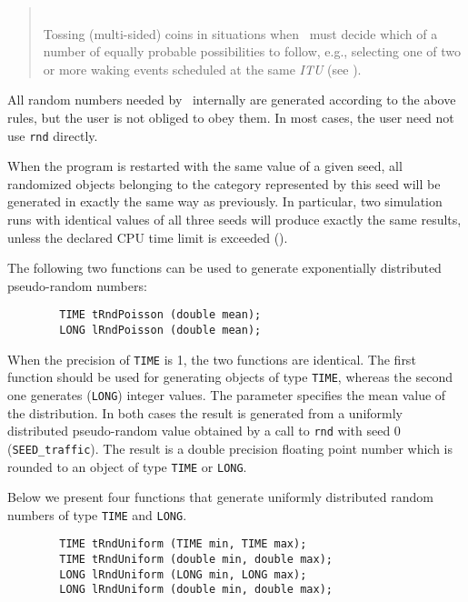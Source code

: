\begin{quote}
\noindent{}\\ \hspace{0in}
Tossing (multi-sided) coins in situations when \smurph\ must
decide which of a number of equally probable possibilities to
follow, e.g., selecting one of two or more waking events scheduled at the
same {\em ITU\/} (see ).
\end{quote}\medskip

All random numbers needed by \smurph\ internally are generated according
to the above rules, but the user is not obliged to obey them.
In most cases, the user need not use {\tt rnd} directly.

When the program is restarted with the same value of a given seed, all
randomized objects belonging to the category represented by this seed will be
generated in exactly the same way as previously.
In particular, two
simulation runs with identical values of all three seeds will produce
exactly the same results, unless the declared CPU time limit is exceeded
().

The following two functions can be used to generate exponentially distributed
pseudo-random numbers:
\begin{verbatim}
        TIME tRndPoisson (double mean);
        LONG lRndPoisson (double mean);
\end{verbatim}

When the precision of {\tt TIME} is 1, the two functions are identical.
The first function should be used for generating objects
of type {\tt TIME},
whereas the second one generates ({\tt LONG}) integer values.
The parameter specifies the mean value of the distribution.
In both cases the result is generated from a uniformly
distributed pseudo-random
value obtained by a call to {\tt rnd} with seed 0 ({\tt SEED\_traffic}).
The result is a double precision floating point number which is rounded
to an object of type {\tt TIME} or {\tt LONG}.

Below we present four functions that generate uniformly distributed random
numbers of type {\tt TIME} and {\tt LONG}.
\begin{verbatim}
        TIME tRndUniform (TIME min, TIME max);
        TIME tRndUniform (double min, double max);
        LONG lRndUniform (LONG min, LONG max);
        LONG lRndUniform (double min, double max);
\end{verbatim}

